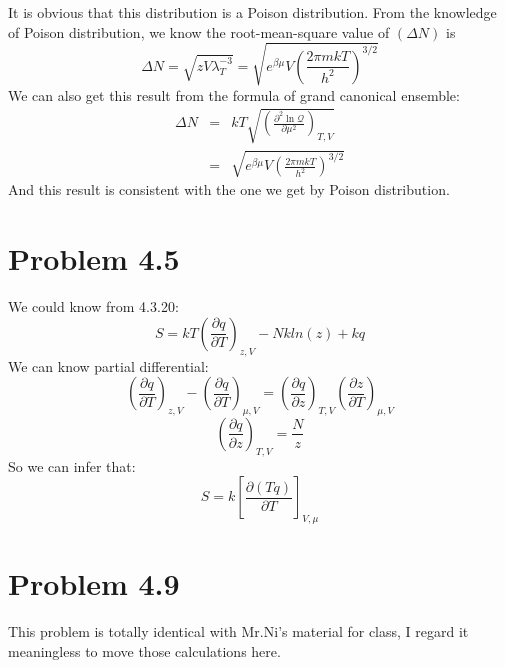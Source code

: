\documentclass{article}
\begin{document}
It is obvious that this distribution is a Poison distribution. From the knowledge of Poison distribution, we know the root-mean-square value of $(\Delta N)$ is
\begin{equation}
\Delta N = \sqrt{zV\lambda_T^{-3}}=\sqrt{e^{\beta\mu}V\left(\frac{2\pi mkT}{h^2}\right)^{3/2}}
\end{equation}
We can also get this result from the formula of grand canonical ensemble:
\begin{eqnarray}
\Delta N &=&kT\sqrt{ \left(\frac{\partial^2 \ln\mathcal{Q}}{\partial\mu^2}\right)_{T,V}}\nonumber\\
&=&\sqrt{e^{\beta\mu}V\left(\frac{2\pi mkT}{h^2}\right)^{3/2}}
\end{eqnarray}
And this result is consistent with the one we get by Poison distribution.

\section*{Problem 4.5} %
\label{sec:problem_4_5}
	
	We could know from 4.3.20:
	$$S=kT(\frac{\partial q}{\partial T})_{z,V}-Nkln(z)+kq$$
	We can know partial differential:
	$$(\frac{\partial q}{\partial T})_{z,V}-(\frac{\partial q}{\partial T})_{\mu,V}=(\frac{\partial q}{\partial z})_{T,V}(\frac{\partial z}{\partial T})_{\mu,V}$$
	$$(\frac{\partial q}{\partial z})_{T,V}=\frac{N}{z}$$
	So we can infer that:
	$$S=k[\frac{\partial (Tq)}{\partial{T}}]_{V,\mu}$$
\section*{Problem 4.9}
This problem is totally identical with Mr.Ni's material for class, I regard it meaningless to move those calculations here.
\end{document}
